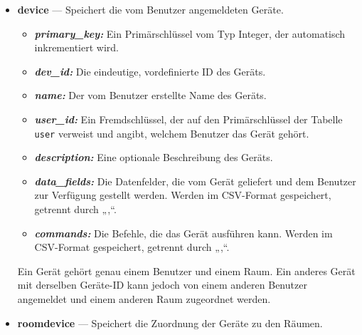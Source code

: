 \documentclass[12pt, letterpaper]{article}
\begin{document}
\begin{itemize}
\begin{itemize}
                          \item \textit{\textbf{primary\_key:}} Ein Primärschlüssel vom Typ Integer, der automatisch inkrementiert wird.
                          \item \textit{\textbf{name:}} Der vom Benutzer erstellte Name des Raums.
                          \item \textit{\textbf{house\_id:}} Ein Fremdschlüssel, der auf den Primärschlüssel der Tabelle \texttt{house} verweist.
                        \end{itemize}
                        \par Ein Raum gehört immer zu einem bestimmten Haus. Ein Raum kann mehrere Geräte enthalten.
    \item \textbf{device} --- Speichert die vom Benutzer angemeldeten Geräte. 
                        \begin{itemize}
                          \item \textit{\textbf{primary\_key:}} Ein Primärschlüssel vom Typ Integer, der automatisch inkrementiert wird.
                          \item \textit{\textbf{dev\_id:}} Die eindeutige, vordefinierte ID des Geräts. 
                          \item \textit{\textbf{name:}} Der vom Benutzer erstellte Name des Geräts.
                          \item \textit{\textbf{user\_id:}} Ein Fremdschlüssel, der auf den Primärschlüssel der Tabelle \texttt{user} verweist und angibt, welchem Benutzer das Gerät gehört.
                          \item \textit{\textbf{description:}} Eine optionale Beschreibung des Geräts.
                          \item \textit{\textbf{data\_fields:}} Die Datenfelder, die vom Gerät geliefert und dem Benutzer zur Verfügung gestellt werden. Werden im CSV-Format gespeichert, getrennt durch „,“.
                          \item \textit{\textbf{commands:}} Die Befehle, die das Gerät ausführen kann. Werden im CSV-Format gespeichert, getrennt durch „,“.
                        \end{itemize}
                        Ein Gerät gehört genau einem Benutzer und einem Raum. Ein anderes Gerät mit derselben Geräte-ID kann jedoch von einem anderen Benutzer angemeldet und einem anderen Raum zugeordnet werden.
    \item \textbf{roomdevice} --- Speichert die Zuordnung der Geräte zu den Räumen. 

\end{itemize}
\end{document}
